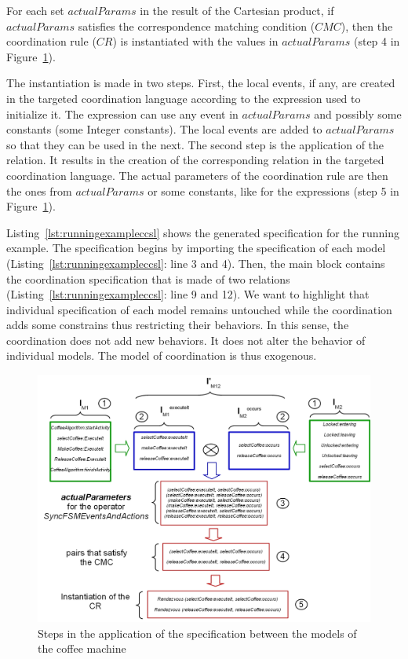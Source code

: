 For each set $actualParams$ in the result of the Cartesian product, if $actualParams$ satisfies the correspondence matching condition ($CMC$), then the coordination rule ($CR$) is instantiated with the values in $actualParams$ (step 4 in Figure~\ref{fig:semantics}).

The instantiation is made in two steps. First, the local events, if any, are created in the targeted coordination language according to the expression used to initialize it. The expression can use any event in $actualParams$ and possibly some constants (\eg some Integer constants). The local events are added to $actualParams$ so that they can be used in the next. The second step is the application of the relation. It results in the creation of the corresponding relation in the targeted coordination language. The actual parameters of the coordination rule are then the ones from $actualParams$ or some constants, like for the expressions (step 5 in Figure~\ref{fig:semantics}).

Listing~\ref{lst:runningexampleccsl} shows the generated \ccsl specification for the running example. The specification begins by importing the \ccsl specification of each model (Listing~\ref{lst:runningexampleccsl}: line 3 and 4). Then, the main block contains the coordination specification that is made of two relations (Listing~\ref{lst:runningexampleccsl}: line 9 and 12). We want to highlight that individual specification of each model remains untouched while the coordination adds some constrains thus restricting their behaviors. In this sense, the coordination does not add new behaviors. It does not alter the behavior of individual models. The model of coordination is thus exogenous.

\begin{figure}
	\center
	\includegraphics[width=.9\textwidth]{bcool/figs/semantics.jpg}
	\caption{Steps in the application of the \bcool specification between the models of the coffee machine}
	\label{fig:semantics}
\end{figure}



